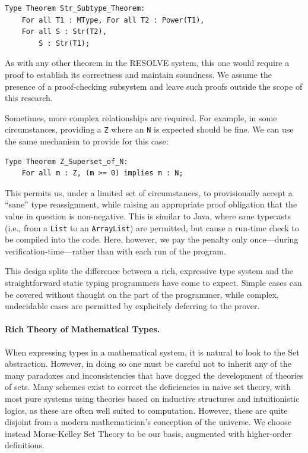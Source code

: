 \begin{lstlisting}
Type Theorem Str_Subtype_Theorem:
	For all T1 : MType, For all T2 : Power(T1),
	For all S : Str(T2),
		S : Str(T1);
\end{lstlisting}

As with any other theorem in the RESOLVE system, this one would require a proof to establish its correctness and maintain soundness.  We assume the presence of a proof-checking subsystem and leave such proofs outside the scope of this research.

Sometimes, more complex relationships are required.  For example, in some circumstances, providing a \texttt{Z} where an \texttt{N} is expected should be fine.  We can use the same mechanism to provide for this case:

\begin{lstlisting}
Type Theorem Z_Superset_of_N:
	For all m : Z, (m >= 0) implies m : N;
\end{lstlisting}

This permits us, under a limited set of circumstances, to provisionally accept a ``sane'' type reassignment, while raising an appropriate proof obligation that the value in question is non-negative.  This is similar to Java, where sane typecasts (i.e., from a \texttt{List} to an \texttt{ArrayList}) are permitted, but cause a run-time check to be compiled into the code.  Here, however, we pay the penalty only once---during verification-time---rather than with each run of the program.

This design splits the difference between a rich, expressive type system and the straightforward static typing programmers have come to expect.  Simple cases can be covered without thought on the part of the programmer, while complex, undecidable cases are permitted by explicitely deferring to the prover.

\paragraph{Rich Theory of Mathematical Types.}\label{subsubsect:richSetTheory}
When expressing types in a mathematical system, it is natural to look to the Set abstraction.  However, in doing so one must be careful not to inherit any of the many paradoxes and inconsistencies that have dogged the development of theories of sets.  Many schemes exist to correct the deficiencies in naive set theory, with most pure systems using theories based on inductive structures and intuitionistic logics, as these are often well suited to computation.  However, these are quite disjoint from a modern mathematician's conception of the universe.  We choose instead Morse-Kelley Set Theory to be our basis, augmented with higher-order definitions.


